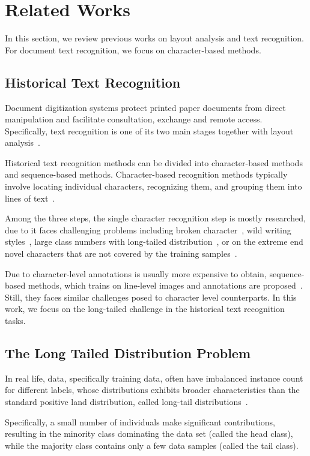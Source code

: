 \section{Related Works}
\label{sec:formatting}
In this section, we review previous works on layout analysis and text recognition. For document text recognition, we focus on character-based methods.


\subsection{Historical Text Recognition}
Document digitization systems protect printed paper documents from direct manipulation and facilitate consultation, exchange and remote access. Specifically, text recognition is one of its two main stages together with layout analysis~\cite{jla}.

Historical text recognition methods can be divided into character-based methods and sequence-based methods. 
Character-based recognition methods typically involve locating individual characters, recognizing them, and grouping them into lines of text~\cite{papytwin}.

Among the three steps, the single character recognition step is mostly researched, due to it faces challenging problems including broken character~\cite{broken}, wild writing styles~\cite{obc306}, large class numbers with long-tailed distribution~\cite{fewran}, or on the extreme end novel characters that are not covered by the training samples~\cite{hde,ligarature}.

Due to character-level annotations is usually more expensive to obtain,  sequence-based methods, which trains on line-level images and annotations are proposed~\cite{eccvfork,jinic21}. Still, they faces similar challenges posed to character level counterparts. In this work, we focus on the long-tailed challenge in the historical text recognition tasks.

\subsection{The Long Tailed Distribution Problem}


In real life, data, specifically training data, often have imbalanced instance count for different labels, whose distributions exhibits broader characteristics than the standard positive land distribution, called long-tail distributions~\cite{}. 

Specifically, a small number of individuals make significant contributions, resulting in the minority class dominating the data set (called the head class), while the majority class contains only a few data samples (called the tail class). 


